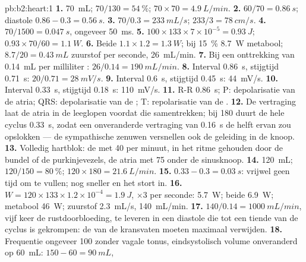 \begin{solution}{pb:b2:heart:1}
\textbf{1.} \qty{70}{mL}; $70/130 = \qty{54}{\%}$; $70\times 70 =
\qty{4.9}{L/min}$.
\textbf{2.} $60/70 = \qty{0.86}{s}$; diastole $0.86 - 0.3 =
\qty{0.56}{s}$.
\textbf{3.} $70/0.3 = \qty{233}{mL/s}$; $233/3 = \qty{78}{cm/s}$.
\textbf{4.} $70/1500 = \qty{0.047}{s}$, ongeveer \qty{50}{ms}.
\textbf{5.} $100\times 133\times 7\times 10^{-5} = \qty{0.93}{J}$;
$0.93\times 70/60 = \qty{1.1}{W}$.
\textbf{6.} Beide  $1.1\times 1.2 = \qty{1.3}{W}$; bij
\qty{15}{\%} \qty{8.7}{W} metabool; $8.7/20 = \qty{0.43}{mL}$
zuurstof per seconde, \qty{26}{mL/min}.
\textbf{7.} Bij een onttrekking van \qty{0.14}{mL} per milliliter :
$26/0.14 = \qty{190}{mL/min}$.
\textbf{8.} Interval \qty{0.86}{s}, stijgtijd \qty{0.71}{s}:
$20/0.71 = \qty{28}{mV/s}$.
\textbf{9.} Interval \qty{0.6}{s}, stijgtijd \qty{0.45}{s}: \qty{44}{mV/s}.
\textbf{10.} Interval \qty{0.33}{s}, stijgtijd \qty{0.18}{s}: \qty{110}{mV/s}.
\textbf{11.} R-R \qty{0.86}{s}; P: depolarisatie van de atria; QRS:
depolarisatie van de ; T: repolarisatie van de .
\textbf{12.} De vertraging laat de atria in de  leeglopen voordat
die samentrekken; bij 180 duurt de hele cyclus \qty{0.33}{s}, zodat een
onveranderde vertraging van \qty{0.16}{s} de helft ervan zou opslokken ---
de sympathische zenuwen versnellen ook de geleiding in de knoop.
\textbf{13.} Volledig hartblok: de  met 40 per minuut, in het
ritme gehouden door de bundel of de purkinjevezels, de atria met 75 onder de
sinusknoop.
\textbf{14.} \qty{120}{mL}; $120/150 = \qty{80}{\%}$; $120\times 180 =
\qty{21.6}{L/min}$.
\textbf{15.} $0.33 - 0.3 = \qty{0.03}{s}$: vrijwel geen tijd om te vullen;
nog sneller en het  stort in.
\textbf{16.} $W = 120\times 133\times 1.2\times 10^{-4} = \qty{1.9}{J}$,
$\times 3$ per seconde: \qty{5.7}{W}; beide  \qty{6.9}{W};
metabool \qty{46}{W}; zuurstof \qty{2.3}{mL/s}, \qty{140}{mL/min}.
\textbf{17.} $140/0.14 = \qty{1000}{mL/min}$, vijf keer de rustdoorbloeding,
te leveren in een diastole die tot een tiende van de cyclus is gekrompen: de
 van de kransvaten moeten maximaal verwijden.
\textbf{18.} Frequentie ongeveer 100 zonder vagale tonus, eindsystolisch
volume onveranderd op \qty{60}{mL}:  $150 - 60 = \qty{90}{mL}$,

\end{solution}
